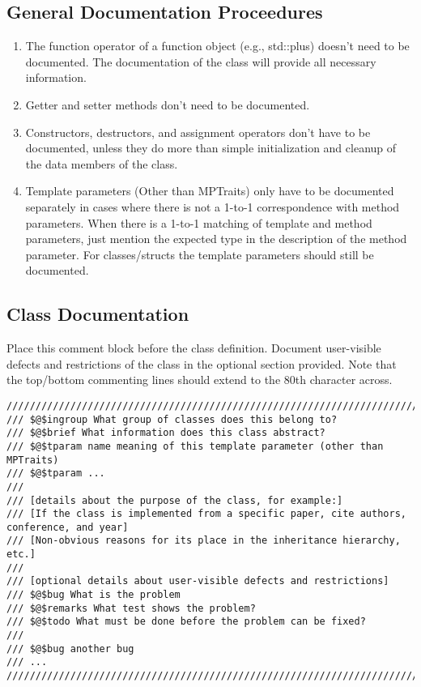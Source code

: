 \documentclass[12pt]{article}
\begin{document}
\subsection{General Documentation Proceedures}

\begin{enumerate}
  \item The function operator of a function object (e.g., std::plus) doesn’t
    need to be documented. The documentation of the class will provide all
    necessary information.
  \item Getter and setter methods don’t need to be documented.
  \item Constructors, destructors, and assignment operators don’t have to be
    documented, unless they do more than simple initialization and cleanup of
    the data members of the class.
  \item Template parameters (Other than MPTraits) only have to be documented
    separately in cases where there is not a 1-to-1 correspondence with method
    parameters. When there is a 1-to-1 matching of template and method
    parameters, just mention the expected type in the description of the method
    parameter. For classes/structs the template parameters should still be
    documented.
\end{enumerate}

\subsection{Class Documentation}

Place this comment block before the class definition. Document user-visible
defects and restrictions of the class in the optional section provided. Note
that the top/bottom commenting lines should extend to the 80th character across.

\begin{lstlisting}[mathescape]
////////////////////////////////////////////////////////////////////////////////
/// $@$ingroup What group of classes does this belong to?
/// $@$brief What information does this class abstract?
/// $@$tparam name meaning of this template parameter (other than MPTraits)
/// $@$tparam ...
///
/// [details about the purpose of the class, for example:]
/// [If the class is implemented from a specific paper, cite authors, conference, and year]
/// [Non-obvious reasons for its place in the inheritance hierarchy, etc.]
///
/// [optional details about user-visible defects and restrictions]
/// $@$bug What is the problem
/// $@$remarks What test shows the problem?
/// $@$todo What must be done before the problem can be fixed?
///
/// $@$bug another bug
/// ...
////////////////////////////////////////////////////////////////////////////////
\end{lstlisting}
\end{document}
